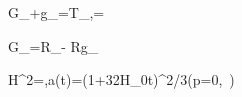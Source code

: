 G_{\mu\nu}+\Lambda g_{\mu\nu}=\kappa T_{\mu\nu},\qquad \kappa=

G_{\mu\nu}=R_{\mu\nu}- Rg_{\mu\nu}

H^2=,\qquad a(t)=\left(1+\frac32H_0t\right)^{2/3}\quad(p=0,\ )
